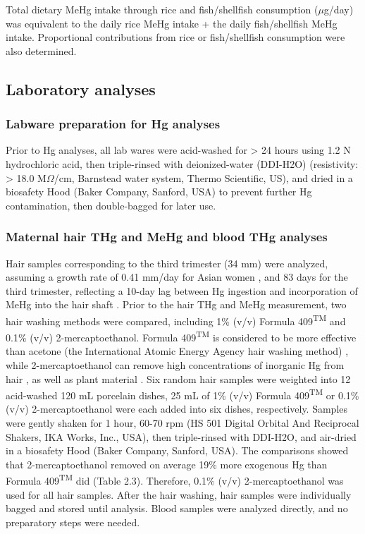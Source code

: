 Total dietary MeHg intake through rice and fish/shellfish consumption (\({\mu}\)g/day) was equivalent to the daily rice MeHg intake + the daily fish/shellfish MeHg intake. Proportional contributions from rice or fish/shellfish consumption were also determined. 

\subsection{Laboratory analyses}

\subsubsection{Labware preparation for Hg analyses}

Prior to Hg analyses, all lab wares were acid-washed for > 24 hours using 1.2 N hydrochloric acid, then triple-rinsed with deionized-water (DDI-H2O) (resistivity: > 18.0 M\({\Omega}\)/cm, Barnstead water system, Thermo Scientific, US), and dried in a biosafety Hood (Baker Company, Sanford, USA) to prevent further Hg contamination, then double-bagged for later use. 

\subsubsection{Maternal hair THg and MeHg and blood THg analyses}

Hair samples corresponding to the third trimester (34 mm) were analyzed, assuming a growth rate of 0.41 mm/day for Asian women \citep{loussouarn2005diversity}, and 83 days for the third trimester, reflecting a 10-day lag between Hg ingestion and incorporation of MeHg into the hair shaft \cite{cernichiari1994biological}. Prior to the hair THg and MeHg measurement, two hair washing methods were compared, including 1\% (v/v) Formula 409\textsuperscript{TM} and 0.1\% (v/v) 2-mercaptoethanol. Formula 409\textsuperscript{TM} is considered to be more effective than acetone (the International Atomic Energy Agency hair washing method) \citep{rothenberg2013prenatal}, while 2-mercaptoethanol can remove high concentrations of inorganic Hg from hair \citep{li2011human}, as well as plant material \citep{north2000heterogeneity}. Six random hair samples were weighted into 12 acid-washed 120 mL porcelain dishes, 25 mL of 1\% (v/v) Formula 409\textsuperscript{TM} or 0.1\% (v/v) 2-mercaptoethanol were each added into six dishes, respectively. Samples were gently shaken for 1 hour, 60-70 rpm (HS 501 Digital Orbital And Reciprocal Shakers, IKA Works, Inc., USA), then triple-rinsed with DDI-H2O, and air-dried in a biosafety Hood (Baker Company, Sanford, USA). The comparisons showed that 2-mercaptoethanol removed on average 19\% more exogenous Hg than Formula 409\textsuperscript{TM} did (Table 2.3). Therefore, 0.1\% (v/v) 2-mercaptoethanol was used for all hair samples. After the hair washing, hair samples were individually bagged and stored until analysis. Blood samples were analyzed directly, and no preparatory steps were needed.

